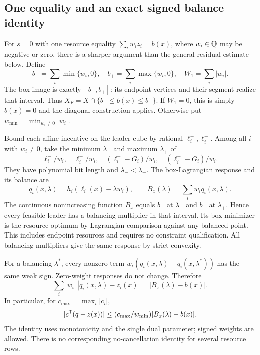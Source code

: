 \subsection{One equality and an exact signed balance identity}
\label{subsec:accuracy-one-resource}

For $s=0$ with one resource equality $\sum_iw_iz_i=b(x)$, where
$w_i\in\mathbb Q$ may be negative or zero, there is a sharper argument than
the general residual estimate below. Define
\[
 b_-=\sum_i\min\{w_i,0\},\quad b_+=\sum_i\max\{w_i,0\},\quad
 W_1=\sum_i|w_i|.
\]
The box image is exactly $[b_-,b_+]$: its endpoint vertices and their
segment realize that interval. Thus $X_F=X\cap\{b_-\le b(x)\le b_+\}$.
If $W_1=0$, this is simply $b(x)=0$ and the diagonal construction
applies. Otherwise put $w_{\min}=\min_{w_i\ne0}|w_i|$.

Bound each affine incentive on the leader cube by rational
$\ell_i^-,\ell_i^+$. Among all $i$ with $w_i\ne0$, take the minimum
$\lambda_-$ and maximum $\lambda_+$ of
\[
 \ell_i^-/w_i,\quad\ell_i^+/w_i,\quad
 (\ell_i^--G_i)/w_i,\quad(\ell_i^+-G_i)/w_i.
\]
They have polynomial bit length and $\lambda_-<\lambda_+$.
The box-Lagrangian response and its balance are
\[
 q_i(x,\lambda)=h_i(\ell_i(x)-\lambda w_i),\qquad
 B_x(\lambda)=\sum_iw_iq_i(x,\lambda).
\]
The continuous nonincreasing function $B_x$ equals $b_+$ at
$\lambda_-$ and $b_-$ at $\lambda_+$. Hence every feasible leader
has a balancing multiplier in that interval. Its box minimizer is the
resource optimum by Lagrangian comparison against any balanced point.
This includes endpoint resources and requires no constraint qualification.
All balancing multipliers give the same response by strict convexity.

For a balancing $\lambda^*$, every nonzero term
$w_i(q_i(x,\lambda)-q_i(x,\lambda^*))$ has the same weak sign.
Zero-weight responses do not change. Therefore
\begin{equation}\label{eq:signed-balance-identity}
 \sum_i|w_i|\,|q_i(x,\lambda)-z_i(x)|
                         =|B_x(\lambda)-b(x)|.
\end{equation}
In particular, for $c_{\max}=\max_i|c_i|$,
\[
 |c^{\mathsf T}(q-z(x))|\le(c_{\max}/w_{\min})|B_x(\lambda)-b(x)|.
\]
The identity uses monotonicity and the single dual parameter; signed
weights are allowed. There is no corresponding no-cancellation identity for
several resource rows.

